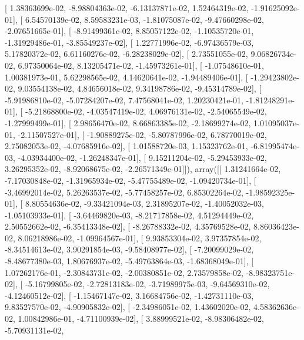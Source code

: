 \documentclass{article}
\begin{document}
       [  1.38363699e-02,  -8.98804363e-02,  -6.13137871e-02,
          1.52464319e-02,  -1.91625092e-01],
       [  6.54570139e-02,   8.59583231e-03,  -1.81075087e-02,
         -9.47660298e-02,  -2.07651665e-01],
       [ -8.91499361e-02,   8.85057122e-02,  -1.10535720e-01,
         -1.31929486e-01,  -3.85549237e-02],
       [  1.22771996e-02,  -6.97436579e-03,   5.17820372e-02,
          6.61160276e-02,  -6.28238029e-02],
       [  2.73551055e-02,   9.06826734e-02,   6.97350064e-02,
          8.13205471e-02,  -1.45973261e-01],
       [ -1.07548610e-01,   1.00381973e-01,   5.62298565e-02,
          4.14620641e-02,  -1.94489406e-01],
       [ -1.29423802e-02,   9.03554138e-02,   4.84656018e-02,
          9.34198786e-02,  -9.45314789e-02],
       [ -5.91986810e-02,  -5.07284207e-02,   7.47568041e-02,
          1.20230421e-01,  -1.81248291e-01],
       [ -5.21868800e-02,  -4.03547419e-02,   4.06976131e-02,
         -2.54065549e-02,  -1.27999499e-01],
       [  2.98656470e-02,   8.66863385e-02,  -2.18699274e-02,
          1.01095037e-01,  -2.11507527e-01],
       [ -1.90889275e-02,  -5.80787996e-02,   6.78770019e-02,
          2.75082053e-02,  -4.07685916e-02],
       [  1.01588720e-03,   1.15323762e-01,  -6.81995474e-03,
         -4.03934400e-02,  -1.26248347e-01],
       [  9.15211204e-02,  -5.29453933e-02,   3.26295352e-02,
         -8.92068675e-02,  -2.26571349e-01]]), array([[  1.31241664e-02,  -7.17030848e-02,  -1.31965934e-02,
         -5.47755489e-02,  -1.09420734e-01],
       [ -3.46992014e-02,   5.26263537e-02,  -5.77458257e-02,
          6.85302264e-02,  -1.98592325e-01],
       [  8.80554636e-02,  -9.33421094e-03,   2.31895207e-02,
         -1.40052032e-03,  -1.05103933e-01],
       [ -3.64469820e-03,  -8.21717858e-02,   4.51294449e-02,
          2.50552662e-02,  -6.35413348e-02],
       [ -8.26788332e-02,   4.35769528e-02,   8.86036423e-02,
          8.06218986e-02,  -1.09964567e-01],
       [  9.93853304e-02,   3.97357854e-02,  -8.34514613e-02,
          3.90291854e-03,  -9.58408977e-02],
       [ -7.20099029e-02,  -8.48677380e-03,   1.80676937e-02,
         -5.49763864e-03,  -1.68368049e-01],
       [  1.07262176e-01,  -2.30843731e-02,  -2.00380851e-02,
          2.73579858e-02,  -8.98323751e-02],
       [ -5.16799805e-02,  -2.72813183e-02,  -3.71989975e-03,
         -9.64569310e-02,  -4.12460512e-02],
       [ -1.15467147e-02,   3.16684756e-02,  -1.42731110e-03,
          9.83527570e-02,  -4.90905832e-02],
       [ -2.34986051e-02,   1.43602020e-02,   4.58362636e-02,
          1.00842986e-01,  -4.71100939e-02],
       [  3.88999521e-02,  -8.98306482e-02,  -5.70931131e-02,
\end{document}
